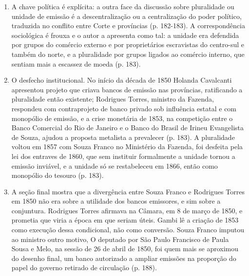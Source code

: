 \begin{enumerate}[leftmargin=*,nosep]
\item A chave política é explícita: a outra face da discussão sobre pluralidade
ou unidade de emissão é a descentralização ou a centralização do poder político,
traduzida no conflito entre Corte e províncias (p. 182-183). A correspondência
sociológica é frouxa e o autor a apresenta como tal: a unidade era defendida por
grupos do comércio externo e por proprietários escravistas do centro-sul e
também do norte, e a pluralidade por grupos ligados ao comércio interno, que
sentiam mais a escassez de moeda (p. 183).

\item O desfecho institucional. No início da década de 1850 Holanda Cavalcanti
apresentou projeto que criava bancos de emissão nas províncias, ratificando a
pluralidade então existente; Rodrigues Torres, ministro da Fazenda, respondeu
com contraprojeto de banco privado sob influência estatal e com monopólio de
emissão, e a crise monetária de 1853, na competição entre o Banco Comercial do
Rio de Janeiro e o Banco do Brasil de Irineu Evangelista de Souza, ajudou a
proposta metalista a prevalecer (p. 183). A pluralidade voltou em 1857 com
Souza Franco no Ministério da Fazenda, foi desfeita pela lei dos entraves de
1860, que sem instituir formalmente a unidade tornou a emissão inviável, e a
unidade só se restabeleceu em 1866, então como monopólio do tesouro (p. 183).

\item A seção final mostra que a divergência entre Souza Franco e Rodrigues
Torres em 1850 não era sobre a utilidade dos bancos emissores, e sim sobre a
conjuntura. Rodrigues Torres afirmava na Câmara, em 8 de março de 1850,
 e prometia
que viria a época em que seriam úteis. Gambi lê a criação de 1853 como execução
dessa condicional, não como conversão. Souza Franco imputou ao ministro outro
motivo,  O deputado por
São Paulo Francisco de Paula Sousa e Melo, na sessão de 26 de abril de 1850, foi
quem mais se aproximou do desenho final, um banco autorizado a ampliar emissões
na proporção do papel do governo retirado de circulação (p. 188).
\end{enumerate}

